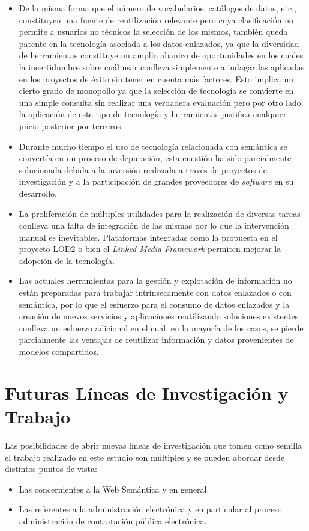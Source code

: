 \begin{itemize}

 \item De la misma forma que el número de vocabularios, catálogos de datos, etc., constituyen una fuente de reutilización 
relevante pero cuya clasificación no permite a usuarios no técnicos la selección de los mismos, también queda patente en la tecnología 
asociada a los datos enlazados, ya que la diversidad de herramientas constituye un amplio abanico de oportunidades en los cuales 
la incertidumbre sobre cuál usar conlleva simplemente a indagar las aplicadas en los proyectos de éxito sin tener en cuenta 
más factores. Esto implica un cierto grado de monopolio ya que la selección de tecnología se convierte en una simple consulta 
sin realizar una verdadera evaluación pero por otro lado la aplicación de este tipo de tecnología y herramientas justifica 
cualquier juicio posterior por terceros.

\item Durante mucho tiempo el uso de tecnología relacionada con semántica se convertía en un proceso de depuración, esta cuestión 
ha sido parcialmente solucionada debida a la inversión realizada a través de proyectos de investigación y a la participación de grandes 
proveedores de \textit{software} en su desarrollo.

\item La proliferación de múltiples utilidades para la realización de diversas tareas conlleva una falta de integración de las mismas 
por lo que la intervención manual es inevitables. Plataformas integradas como la propuesta en el proyecto LOD2 o bien el 
\textit{Linked Media Framework} permiten mejorar la adopción de la tecnología.

\item Las actuales herramientas para la gestión y explotación de información no están preparadas para trabajar intrínsecamente 
con datos enlazados o con semántica, por lo que el esfuerzo para el consumo de datos enlazados y la creación de nuevos 
servicios y aplicaciones reutilizando soluciones existentes conlleva un esfuerzo adicional en el cual, en la mayoría de los casos, 
se pierde parcialmente las ventajas de reutilizar información y datos provenientes de modelos compartidos.

\end{itemize}

\section{Futuras Líneas de Investigación y Trabajo}
Las posibilidades de abrir nuevas líneas de investigación que tomen como semilla el trabajo realizado en este estudio son múltiples 
y se pueden abordar desde distintos puntos de vista:
\begin{itemize}
 \item Las concernientes a la Web Semántica y \linkeddata en general.
 \item Las referentes a la administración electrónica y en particular al proceso administración de contratación pública electrónica.
\end{itemize}

